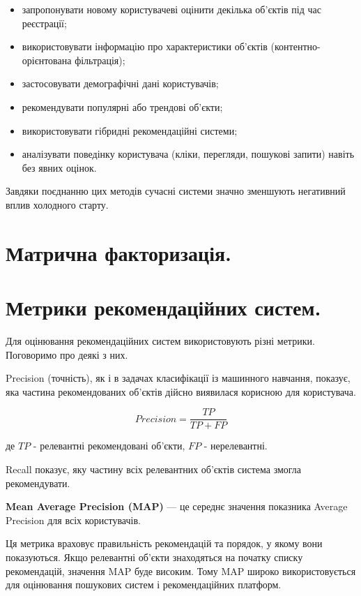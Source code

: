 \begin{itemize}
\item запропонувати новому користувачеві оцінити декілька об'єктів під час реєстрації;
\item використовувати інформацію про характеристики об'єктів (контентно-орієнтована фільтрація);
\item застосовувати демографічні дані користувачів;
\item рекомендувати популярні або трендові об'єкти;
\item використовувати гібридні рекомендаційні системи;
\item аналізувати поведінку користувача (кліки, перегляди, пошукові запити) навіть без явних оцінок.
\end{itemize}

Завдяки поєднанню цих методів сучасні системи значно зменшують негативний вплив холодного старту.

\section{Матрична факторизація.}





\section{Метрики рекомендаційних систем.}

Для оцінювання рекомендаційних систем використовують різні метрики. Поговоримо про деякі з них.

Precision (точність), як і в задачах класифікації із машинного навчання, показує, яка частина рекомендованих об'єктів дійсно виявилася корисною для користувача.

$$Precision = \frac{TP}{TP+FP}$$

де $TP$ - релевантні рекомендовані об'єкти, $FP$ - нерелевантні.

Recall показує, яку частину всіх релевантних об'єктів система змогла рекомендувати. 

\textbf{Mean Average Precision (MAP)} — це середнє значення показника Average Precision для всіх користувачів.

Ця метрика враховує правильність рекомендацій та порядок, у якому вони показуються. Якщо релевантні об'єкти знаходяться на початку списку рекомендацій, значення MAP буде високим. Тому MAP широко використовується для оцінювання пошукових систем і рекомендаційних платформ.

